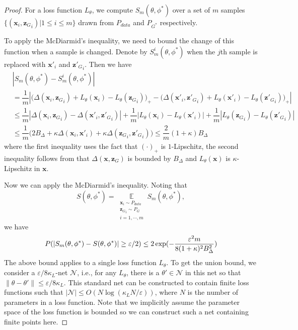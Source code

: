 \documentclass[11pt,fullpage, letterpaper,twoside]{article}
\newcommand{\1}[1]{\mathds{1}_{\left[#1\right]}}
\begin{document}
\begin{proof}
For a loss function $L_\theta$, we compute $S_m(\theta,\phi^*)$ over a set of $m$ samples $\{(\mathbf x_i, {\mathbf z_G}_i)|1\leq i\leq m\}$ drawn from $P_{data}$ and $P_{G^*}$ respectively.

To apply the McDiarmid's inequality, we need to bound the change of this function when a sample is changed.  Denote by $S^i_m(\theta,\phi^*)$ when the $j$th sample is replaced with $\mathbf x'_i$ and ${\mathbf z'_G}_i$. Then we have
\[
\begin{aligned}
&|S_m(\theta,\phi^*)-S^i_m(\theta,\phi^*)|\\
&=\dfrac{1}{m}|\big(\Delta(\mathbf x_i, {\mathbf z_G}_i)+L_\theta(\mathbf x_i)-L_\theta({\mathbf z_G}_i)\big)_+
-\big(\Delta(\mathbf x'_i, {\mathbf z'_G}_i)+L_\theta(\mathbf x'_i)-L_\theta({\mathbf z'_G}_i)\big)_+|\\
&\leq \dfrac{1}{m}|\Delta(\mathbf x_i, {\mathbf z_G}_i)-\Delta(\mathbf x'_i, {\mathbf z'_G}_i)|
+\dfrac{1}{m}|L_\theta(\mathbf x_i)-L_\theta(\mathbf x'_i)|
+\dfrac{1}{m}|L_\theta({\mathbf z_G}_i)-L_\theta({\mathbf z'_G}_i)|\\
&\leq \dfrac{1}{m}\big(2B_\Delta+\kappa \Delta(\mathbf x_i,\mathbf x'_i) + \kappa \Delta({\mathbf z_G}_i,{\mathbf z'_G}_i)\big)
\leq \dfrac{2}{m}(1+\kappa)B_\Delta
\end{aligned}
\]
where the first inequality uses the fact that $(\cdot)_+$ is $1$-Lipschitz, the second inequality follows from that
$\Delta(\mathbf x, \mathbf z_G)$ is bounded by $B_\Delta$ and $L_\theta(\mathbf x)$ is $\kappa$-Lipschitz in $\mathbf x$.

Now we can apply the McDiarmid's inequality. Noting that
$$S(\theta,\phi^*)=\mathop\mathbb E\limits_{\substack{\mathbf x_i\sim P_{data}\\ {\mathbf z_G}_i\sim  P_G\\i=1,\cdots,m}}S_m(\theta,\phi^*),$$
we have
\begin{equation}\label{eq:mcdiarmid}
\small
P(|S_m(\theta,\phi^*)-S(\theta,\phi^*)|\geq \varepsilon/2)\leq 2\exp(-\dfrac{\varepsilon^2 m}{8(1+\kappa)^2B_\Delta^2})
\end{equation}
The above bound applies to a single loss function $L_\theta$.  To get the union bound, we consider a $\varepsilon/8\kappa_L$-net $\mathcal N$, i.e., for any $L_\theta$, there is a $\theta'\in\mathcal N$ in this net so that $\|\theta-\theta'\|\leq \varepsilon/8\kappa_L$. This standard net can be constructed to contain finite loss functions such that $|\mathcal N|\leq O(N\log(\kappa_L N/\varepsilon))$, where $N$ is the number of parameters in a loss function. Note that we implicitly assume the parameter space of the loss function is bounded so we can construct such a net containing finite points here.


\end{proof}
\end{document}
